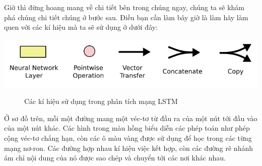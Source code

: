 Giờ thì đừng hoang mang về chi tiết bên trong chúng ngay, chúng ta sẽ khám phá chúng chi tiết chúng ở bước sau. Điều bạn cần làm bây giờ là làm hãy làm quen với các kí hiệu mà ta sẽ sử dụng ở dưới đây:
\begin{center}
    \includegraphics[scale=.3]{image/chapter6/lstm3.png}
    \begin{figure}[htp]
    \begin{center}
     
    \end{center}
    \caption{Các kí hiệu sử dụng trong phân tích mạng LSTM}
    \end{figure}
\end{center}
Ở sơ đồ trên, mỗi một đường mang một véc-tơ từ đầu ra của một nút tới đầu vào của một nút khác. Các hình trong màu hồng biểu diễn các phép toán như phép cộng véc-tơ chẳng hạn, còn các ô màu vàng được sử dụng để học trong các từng mạng nơ-ron. Các đường hợp nhau kí hiệu việc kết hợp, còn các đường rẽ nhánh ám chỉ nội dung của nó được sao chép và chuyển tới các nơi khác nhau.


